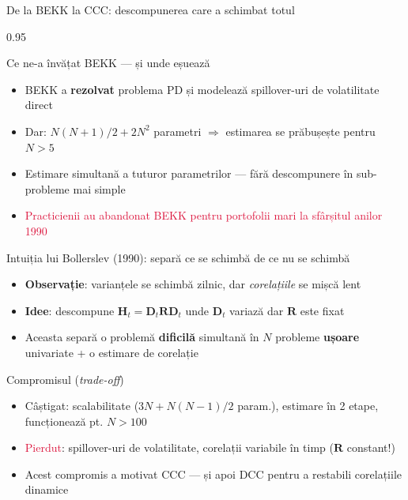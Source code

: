 \documentclass[9pt, aspectratio=169, t]{beamer}
\begin{document}
\begin{frame}{De la BEKK la CCC: descompunerea care a schimbat totul}
    \begin{cminipage}{0.95\textwidth}
    \vspace{-2mm}
    {\scriptsize
    \begin{block}{Ce ne-a învățat BEKK --- și unde eșuează}
        \begin{itemize}\setlength{\itemsep}{0pt}
            \item BEKK a \textbf{rezolvat} problema PD și modelează spillover-uri de volatilitate direct
            \item Dar: $N(N+1)/2 + 2N^2$ parametri $\Rightarrow$ estimarea se prăbușește pentru $N > 5$
            \item Estimare simultană a tuturor parametrilor --- fără descompunere în sub-probleme mai simple
            \item \textcolor{Crimson}{Practicienii au abandonat BEKK pentru portofolii mari la sfârșitul anilor 1990}
        \end{itemize}
    \end{block}
    \vspace{-2mm}
    \begin{alertblock}{Intuiția lui Bollerslev (1990): separă ce se schimbă de ce nu se schimbă}
        \begin{itemize}\setlength{\itemsep}{0pt}
            \item \textbf{Observație}: varianțele se schimbă zilnic, dar \textit{corelațiile} se mișcă lent
            \item \textbf{Idee}: descompune $\mathbf{H}_t = \mathbf{D}_t \mathbf{R} \mathbf{D}_t$ unde $\mathbf{D}_t$ variază dar $\mathbf{R}$ este fixat
            \item Aceasta separă o problemă \textbf{dificilă} simultană în $N$ probleme \textbf{ușoare} univariate + o estimare de corelație
        \end{itemize}
    \end{alertblock}
    \vspace{-2mm}
    \begin{exampleblock}{Compromisul (\textit{trade-off})}
        \begin{itemize}\setlength{\itemsep}{0pt}
            \item \textcolor{Forest}{Câștigat}: scalabilitate ($3N + N(N-1)/2$ param.), estimare în 2 etape, funcționează pt. $N > 100$
            \item \textcolor{Crimson}{Pierdut}: spillover-uri de volatilitate, corelații variabile în timp ($\mathbf{R}$ constant!)
            \item Acest compromis a motivat CCC --- și apoi DCC pentru a restabili corelațiile dinamice
        \end{itemize}
    \end{exampleblock}
    }
    \end{cminipage}
\end{frame}
\end{document}
